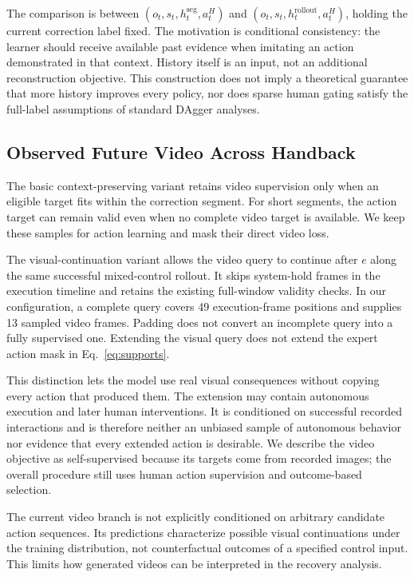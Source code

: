\documentclass[letterpaper,10pt,conference]{ieeeconf}
\begin{document}
The comparison is between $(o_t,s_t,h_t^{\mathrm{seg}},a_t^H)$ and $(o_t,s_t,h_t^{\mathrm{rollout}},a_t^H)$, holding the current correction label fixed. The motivation is conditional consistency: the learner should receive available past evidence when imitating an action demonstrated in that context. History itself is an input, not an additional reconstruction objective. This construction does not imply a theoretical guarantee that more history improves every policy, nor does sparse human gating satisfy the full-label assumptions of standard DAgger analyses.

\subsection{Observed Future Video Across Handback}
The basic context-preserving variant retains video supervision only when an eligible target fits within the correction segment. For short segments, the action target can remain valid even when no complete video target is available. We keep these samples for action learning and mask their direct video loss.

The visual-continuation variant allows the video query to continue after $e$ along the same successful mixed-control rollout. It skips system-hold frames in the execution timeline and retains the existing full-window validity checks. In our configuration, a complete query covers 49 execution-frame positions and supplies 13 sampled video frames. Padding does not convert an incomplete query into a fully supervised one. Extending the visual query does not extend the expert action mask in Eq.~\ref{eq:supports}.

This distinction lets the model use real visual consequences without copying every action that produced them. The extension may contain autonomous execution and later human interventions. It is conditioned on successful recorded interactions and is therefore neither an unbiased sample of autonomous behavior nor evidence that every extended action is desirable. We describe the video objective as self-supervised because its targets come from recorded images; the overall procedure still uses human action supervision and outcome-based selection.

The current video branch is not explicitly conditioned on arbitrary candidate action sequences. Its predictions characterize possible visual continuations under the training distribution, not counterfactual outcomes of a specified control input. This limits how generated videos can be interpreted in the recovery analysis.
\end{document}
